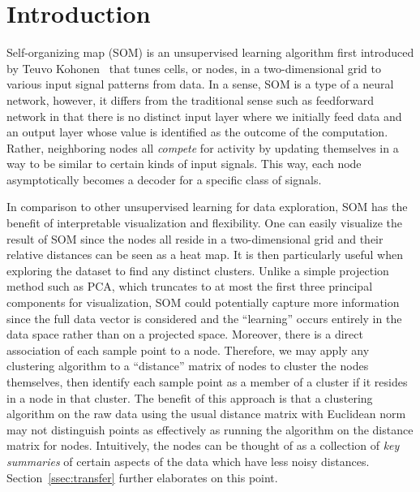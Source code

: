\section{Introduction}\label{sec:introduction}

Self-organizing map (SOM) is an unsupervised learning algorithm
first introduced by Teuvo Kohonen~\cite{kohonen:1990}
that tunes cells, or nodes, in a two-dimensional grid 
to various input signal patterns from data.
In a sense, SOM is a type of a neural network,
however, it differs from the traditional sense
such as feedforward network in that there is 
no distinct input layer where we initially feed data
and an output layer whose value is identified as the outcome of the computation.
Rather, neighboring nodes all \emph{compete} for activity
by updating themselves in a way to be similar to certain kinds of input signals.
This way, each node asymptotically becomes a decoder for a specific class of signals. 

In comparison to other unsupervised learning for data exploration,
SOM has the benefit of interpretable visualization and flexibility.
One can easily visualize the result of SOM
since the nodes all reside in a two-dimensional grid and their relative distances
can be seen as a heat map.
It is then particularly useful when exploring the dataset
to find any distinct clusters.
Unlike a simple projection method such as PCA,
which truncates to at most the first three principal components for visualization,
SOM could potentially capture more information since 
the full data vector is considered and the ``learning'' occurs entirely in the data space
rather than on a projected space.
Moreover, there is a direct association of each sample point to a node.
Therefore, we may apply any clustering algorithm to a ``distance'' matrix of nodes
to cluster the nodes themselves, then identify each sample point as a member of a cluster
if it resides in a node in that cluster. 
The benefit of this approach is that a clustering algorithm on the raw data
using the usual distance matrix with Euclidean norm may not distinguish points as effectively 
as running the algorithm on the distance matrix for nodes.
Intuitively, the nodes can be thought of as a collection of \emph{key summaries} of certain aspects of the data
which have less noisy distances.
Section~\ref{ssec:transfer} further elaborates on this point.

